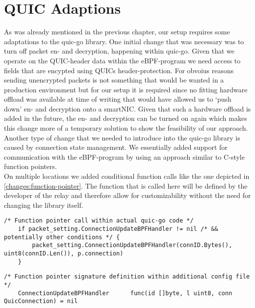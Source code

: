 \section{QUIC Adaptions}\label{sec:quic_adaptions}
As was already mentioned in the previous chapter, our setup requires some adaptations
to the quic-go library.
One initial change that was necessary was to turn off packet en- and decryption, 
happening within quic-go.
Given that we operate on the QUIC-header data within the eBPF-program we need access 
to fields that are encypted using QUICs header-protection.
For obvoius reasons sending unencrypted packets is not something that would be wanted in 
a production environment but for our setup it is required since no fitting hardware offload 
was available at time of writing that would have allowed us to `push down' en- and decryption 
onto a smartNIC\@.
Given that such a hardware offload is added in the future, the en- and decryption can be
turned on again which makes this change more of a temporary solution to show the feasibility
of our approach.
\\
Another type of change that we needed to introduce into the quic-go library is caused by 
connection state management.
We essentially added support for communication with the eBPF-program by using an 
approach similar to C-style function pointers.
\\
On multiple locations we added conditional function calls like the one depicted in 
\autoref{changes:function-pointer}.
The function that is called here will be defined by the developer of the relay and 
therefore allow for customizability without the need for changing the library itself.
\vspace{0.2cm}
\begin{lstlisting}[style=GoStyle, label=changes:function-pointer, caption=An example of a function-pointer addition to the quic-go library.]
    /* Function pointer call within actual quic-go code */
    if packet_setting.ConnectionUpdateBPFHandler != nil /* && potentially other conditions */ {
	    packet_setting.ConnectionUpdateBPFHandler(connID.Bytes(), uint8(connID.Len()), p.connection)
	}
\end{lstlisting}
\vspace{0.2cm}
\begin{lstlisting}[style=GoStyle, label=changes:signature-function-pointer, caption=Only the signature will be defined within the library itself.]
    /* Function pointer signature definition within additional config file */
	ConnectionUpdateBPFHandler      func(id []byte, l uint8, conn QuicConnection) = nil
\end{lstlisting}

